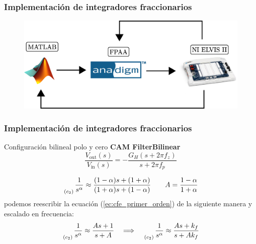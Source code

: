 \documentclass[10pt]{beamer}
\begin{document}
	\begin{frame}
		\frametitle{Implementación de integradores fraccionarios}
		\begin{figure}[hbtp]
			\centering
			\includegraphics[width = 12cm]{descripcion.eps}
		\end{figure}
	\end{frame}
	\begin{frame}
		\frametitle{Implementación de integradores fraccionarios}
		\begin{block}{Configuración bilineal polo y cero}
		\textbf{CAM FilterBilinear}
			\begin{equation}
		\frac{V_{\mathrm{out}} (s)}{V_{\mathrm{in}}(s)} = -\frac{G_{H} (s + 2 \pi f_{z})}{s + 2 \pi f_{p}}
		\label{ec:CAM_bilineal}
	\end{equation}
	
	\begin{equation}
		\genfrac{}{}{0pt}{0}{}{_{(c_{2})}} \frac{1}{s^{\alpha}} \approx \frac{(1 - \alpha)s + (1 + \alpha) }{(1 + \alpha)s + (1 - \alpha)} \qquad A = \frac{1 - \alpha}{1 + \alpha}
		\label{ec:cfe_primer_orden}
	\end{equation}
	podemos reescribir la ecuación (\ref{ec:cfe_primer_orden}) de la siguiente manera y escalado en frecuencia:
	\begin{equation}
		\genfrac{}{}{0pt}{0}{}{_{(c_{2})}} \frac{1}{s^{\alpha}} \approx \frac{A s + 1}{s + A}\quad \Longrightarrow \quad \genfrac{}{}{0pt}{0}{}{_{(c_{2})}} \frac{1}{s^{\alpha}} \approx \frac{A s + k_{f}}{s + A k_{f}}
		\label{ec:cfe_primer_orden_simp}
	\end{equation}
		\end{block}
	\end{frame}
\end{document}
